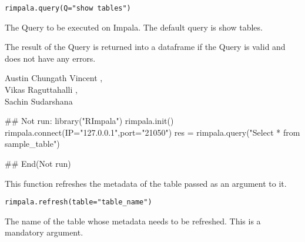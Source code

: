 \documentclass[letterpaper]{book}
\begin{document}
%
\begin{Usage}
\begin{verbatim}
rimpala.query(Q="show tables")
\end{verbatim}
\end{Usage}
%
\begin{Arguments}
\begin{ldescription}
\item[\code{Q}] 
The Query to be executed on Impala. The default query is show tables.

\end{ldescription}
\end{Arguments}
%
\begin{Value}
The result of the Query is returned into a dataframe if the Query is valid and does not have any errors.
\end{Value}
%
\begin{Author}\relax
Austin Chungath Vincent ,\\{}
Vikas Raguttahalli ,\\{}
Sachin Sudarshana 
\end{Author}
%
\begin{Examples}
\begin{ExampleCode}
## Not run: 
library("RImpala")
rimpala.init()
rimpala.connect(IP="127.0.0.1",port="21050")
res = rimpala.query("Select * from sample_table")

## End(Not run)
\end{ExampleCode}
\end{Examples}
%
\begin{Description}\relax
This function refreshes the metadata of the table passed as an argument to it.
\end{Description}
%
\begin{Usage}
\begin{verbatim}
rimpala.refresh(table="table_name")
\end{verbatim}
\end{Usage}
%
\begin{Arguments}
\begin{ldescription}
\item[\code{table}] 
The name of the table whose metadata needs to be refreshed. This is a mandatory argument.

\end{ldescription}
\end{Arguments}
\end{document}

